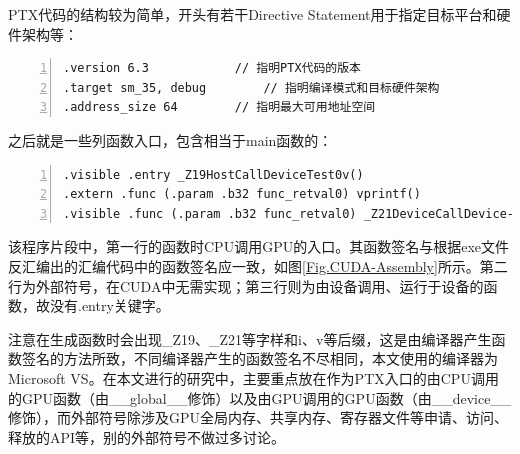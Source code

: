 \par PTX代码的结构较为简单，开头有若干Directive Statement用于指定目标平台和硬件架构等：
\begin{lstlisting}[language={[ANSI]C},numbers=left,numberstyle=\tiny,%frame=shadowbox,  
rulesepcolor=\color{red!20!green!20!blue!20},  
keywordstyle=\color{blue!70!black},  
commentstyle=\color{blue!90!},  
basicstyle=\ttfamily] 
.version 6.3			// 指明PTX代码的版本
.target sm_35, debug		// 指明编译模式和目标硬件架构
.address_size 64		// 指明最大可用地址空间
\end{lstlisting}
之后就是一些列函数入口，包含相当于main函数的：
\begin{lstlisting}[language={[ANSI]C},numbers=left,numberstyle=\tiny,%frame=shadowbox,  
rulesepcolor=\color{red!20!green!20!blue!20},  
keywordstyle=\color{blue!70!black},  
commentstyle=\color{blue!90!},  
basicstyle=\ttfamily] 
.visible .entry _Z19HostCallDeviceTest0v()
.extern .func (.param .b32 func_retval0) vprintf()
.visible .func (.param .b32 func_retval0) _Z21DeviceCallDevice-Test0i()

\end{lstlisting}
\par 该程序片段中，第一行的函数时CPU调用GPU的入口。其函数签名与根据exe文件反汇编出的汇编代码中的函数签名应一致，如图\ref{Fig.CUDA-Assembly}所示。第二行为外部符号，在CUDA中无需实现；第三行则为由设备调用、运行于设备的函数，故没有.entry关键字。
\par 注意在生成函数时会出现\_Z19、\_Z21等字样和i、v等后缀，这是由编译器产生函数签名的方法所致，不同编译器产生的函数签名不尽相同，本文使用的编译器为Microsoft VS。在本文进行的研究中，主要重点放在作为PTX入口的由CPU调用的GPU函数（由\_\_global\_\_修饰）以及由GPU调用的GPU函数（由\_\_device\_\_修饰），而外部符号除涉及GPU全局内存、共享内存、寄存器文件等申请、访问、释放的API等，别的外部符号不做过多讨论。
